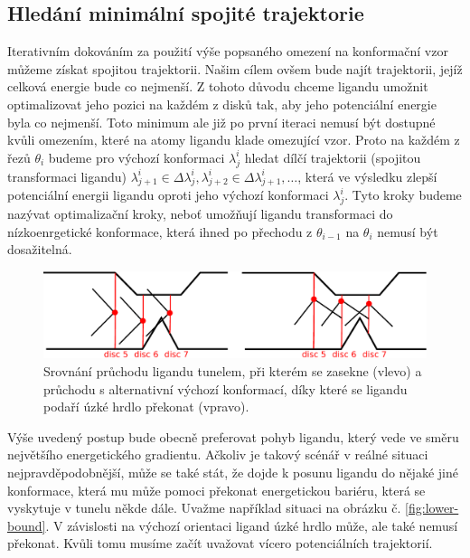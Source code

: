 \subsection{Hledání minimální spojité trajektorie}
Iterativním dokováním za použití výše popsaného omezení na konformační vzor můžeme
získat spojitou trajektorii. Našim cílem ovšem bude najít trajektorii, jejíž
celková energie bude co nejmenší. Z tohoto důvodu chceme ligandu
umožnit optimalizovat jeho pozici na každém z disků tak, aby jeho potenciální
energie byla co nejmenší. Toto minimum ale již po první iteraci nemusí být dostupné
kvůli omezením, které na atomy ligandu klade omezující vzor. Proto na každém
z řezů $ \theta_i $ budeme pro výchozí konformaci $ \lambda^i_j $ hledat dílčí
trajektorii (spojitou transformaci ligandu) $ \lambda^i_{j+1} \in \Delta \lambda^i_j,
\lambda^i_{j+2} \in \Delta \lambda^i_{j+1}, \dots $, která ve výsledku
zlepší potenciální energii ligandu oproti jeho výchozí konformaci $ \lambda^i_j $.
Tyto kroky budeme nazývat optimalizační kroky, neboť umožňují ligandu transformaci
do nízkoenrgetické konformace, která ihned po přechodu z $ \theta_{i - 1} $
na $ \theta_i $ nemusí být dosažitelná.

\begin{figure}[t]
\centering
\includegraphics[width=.8\hsize]{img/tun-3.pdf}
\caption{Srovnání průchodu ligandu tunelem, při kterém se zasekne (vlevo) a
průchodu s alternativní výchozí konformací, díky které se ligandu podaří
úzké hrdlo překonat (vpravo).
}
\label{fig:backtracking}
\end{figure}

Výše uvedený postup bude obecně preferovat pohyb ligandu, který vede ve směru
největšího energetického gradientu. Ačkoliv je takový scénář v reálné situaci
nejpravděpodobnější, může se také stát, že dojde k posunu ligandu do nějaké
jiné konformace, která mu může pomoci překonat energetickou bariéru, která se
vyskytuje v tunelu někde dále. Uvažme například situaci na obrázku
č. \ref{fig:lower-bound}. V závislosti na výchozí orientaci ligand úzké hrdlo
může, ale také nemusí překonat. Kvůli tomu musíme začít uvažovat vícero potenciálních
trajektorií.


